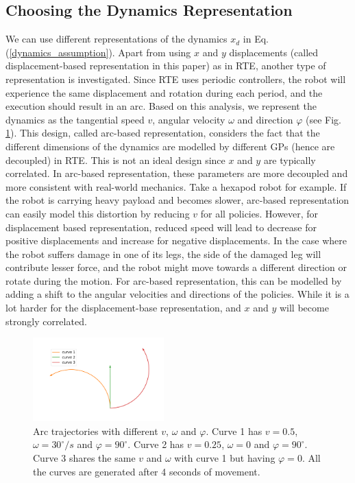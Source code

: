 \documentclass[journal]{IEEEtran}
\begin{document}
\subsection{Choosing the Dynamics Representation}
We can use different representations of the dynamics $x_d$ in Eq. (\ref{dynamics_assumption}).
Apart from using $x$ and $y$ displacements (called displacement-based representation in this paper) as in RTE, another type of representation is investigated.
Since RTE uses periodic controllers, the robot will experience the same displacement and rotation during each period, and the execution should result in an arc.
Based on this analysis, we represent the dynamics as the tangential speed $v$, angular velocity $\omega$ and direction $\varphi$ (see Fig. \ref{arcs}). 
This design, called arc-based representation, considers the fact that the different dimensions of the dynamics are modelled by different GPs (hence are decoupled) in RTE.
This is not an ideal design since $x$ and $y$ are typically correlated.
In arc-based representation, these parameters are more decoupled and more consistent with real-world mechanics. 
Take a hexapod robot for example.
If the robot is carrying heavy payload and becomes slower, arc-based representation can easily model this distortion by reducing $v$ for all policies. However, for displacement based representation, reduced speed will lead to decrease for positive displacements and increase for negative displacements.
In the case where the robot suffers damage in one of its legs, the side of the damaged leg will contribute lesser force, and the robot might move towards a different direction or rotate during the motion.
For arc-based representation, this can be modelled by adding a shift to the angular velocities and directions of the policies.
While it is a lot harder for the displacement-base representation, and $x$ and $y$ will become strongly correlated.
\begin{figure}[h]
\centering
\includegraphics[width=0.45\textwidth]{example_curves.pdf}
\caption{Arc trajectories with different $v$, $\omega$ and $\varphi$. Curve 1 has $v=0.5$, $\omega = 30^\circ/s$ and $\varphi = 90^\circ$. Curve 2 has $v=0.25$, $\omega = 0$ and $\varphi = 90^\circ$.
Curve 3 shares the same $v$ and $\omega$ with curve 1 but having $\varphi = 0$.
All the curves are generated after 4 seconds of movement.
}
\label{arcs}
\end{figure}
\end{document}
